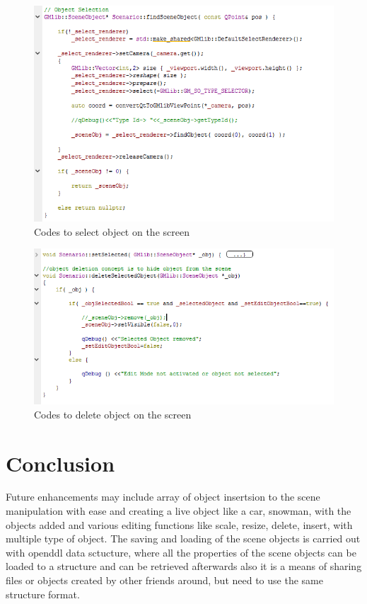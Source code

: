 \documentclass[a4,10pt]{article}
\begin{document}
\begin{figure}[]
\centering
\includegraphics[width=1\textwidth]{gfx/select.png}
\caption{Codes to select object on the screen}
\label{fig:rotateobject}
\end{figure}
\begin{figure}[]
\centering
\includegraphics[width=1\textwidth]{gfx/deleteobject.png}
\caption{Codes to delete object on the screen}
\label{fig:rotateobject}
\end{figure}
\pagebreak
\section{Conclusion}
            Future enhancements may include array of object insertsion to the scene manipulation with ease and creating a live object like a car, snowman, with the objects added and various editing functions like scale, resize, delete, insert, with multiple type of object.
            The saving and loading of the scene objects is carried out with openddl data sctucture, where all the properties of the scene objects can be loaded to a structure and can be retrieved afterwards also it is a means of sharing files or objects created by other friends around, but need to use the same structure format.

	  
	  
	
	
\end{document}
